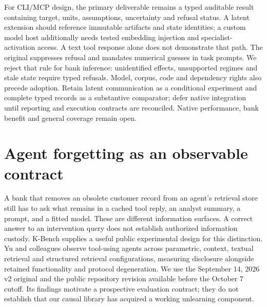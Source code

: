 For CLI/MCP design, the primary deliverable remains a typed auditable result containing target, units, assumptions, uncertainty and refusal status. A latent extension should reference immutable artifacts and state identities; a custom model host additionally needs tested embedding injection and specialist-activation access. A text tool response alone does not demonstrate that path. The original suppresses refusal and mandates numerical guesses in task prompts. We reject that rule for bank inference: unidentified effects, unsupported regimes and stale state require typed refusals. Model, corpus, code and dependency rights also precede adoption. Retain latent communication as a conditional experiment and complete typed records as a substantive comparator; defer native integration until reporting and execution contracts are reconciled. Native performance, bank benefit and general coverage remain open.~\citep{exec24_collaboration_original,exec24_collaboration_reference}


\section{Agent forgetting as an observable contract}
\label{sec:exec24-unlearning}

A bank that removes an obsolete customer record from an agent's retrieval store
still has to ask what remains in a cached tool reply, an analyst summary, a prompt,
and a fitted model. These are different information surfaces. A correct answer to
an intervention query does not establish authorized information custody. K-Bench
supplies a useful public experimental design for this distinction. Yu and
colleagues observe tool-using agents across parametric, context, textual retrieval
and structured retrieval configurations, measuring disclosure alongside retained
functionality and protocol degeneration. We use the September 14, 2026 v2 original
and the public repository revision available before the October 7 cutoff. Its
findings motivate a prospective evaluation contract; they do not establish that
our causal library has acquired a working unlearning component.
\citep{exec24_unlearning_original,exec24_unlearning_software}

